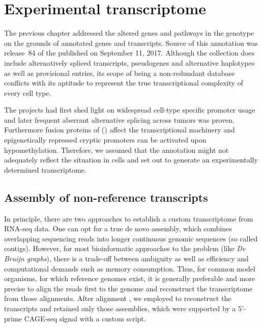 \chapter{Experimental transcriptome}
\label{chap:r:tinats}
\minitoc

The previous chapter addressed the altered genes and pathways in the \dnmtchip genotype on the grounds of annotated genes and transcripts. Source of this annotation was release~\num{84} of the  published on September 11, 2017. Although the  collection does include alternatively spliced transcripts, pseudogenes and alternative haplotypes as well as provisional entries, its scope of being a non-redundant database conflicts with its aptitude to represent the true transcriptional complexity of every cell type. 

The  projects had first shed light on widespread cell-type specific promoter usage\cite{Carninci2005,Faulkner2008} and later frequent aberrant alternative splicing across tumors was proven\cite{Kahles2018}. Furthermore fusion proteins of  (\mllfp) affect the transcriptional machinery\cite{Slany2016} and epigenetically repressed cryptic promoters can be activated upon hypomethylation\cite{Brocks2017}. Therefore, we assumed that the  annotation might not adequately reflect the situation in \mllafnine cells and set out to generate an experimentally determined transcriptome.

\section{Assembly of non-reference transcripts}
\label{chap:r:tinats:stringtie}\label{chap:r:tinats:denovoexpression}\label{chap:r:tinats:denovomethylation} 

\fyfrank

In principle, there are two approaches to establish a custom transcriptome from RNA-seq data. One can opt for a true de novo assembly\cite{Haas2013}, which combines overlapping sequencing reads into longer continuous genomic sequences (so called contigs). However, for most bioinformatic approaches to the problem (like \emph{De Bruijn graphs}), there is a trade-off between ambiguity as well as efficiency and computational demands such as memory consumption. Thus, for common model organisms, for which reference genomes exist, it is generally preferable and more precise to align the reads first to the genome and reconstruct the transcriptome from those alignments\cite{Liao2013,Liao2014,Maretty2014}. After alignment \supple, we employed \cite{Pertea2015} to reconstruct the transcripts and retained only those assemblies, which were supported by a 5'-prime CAGE-seq signal with a custom script. 

